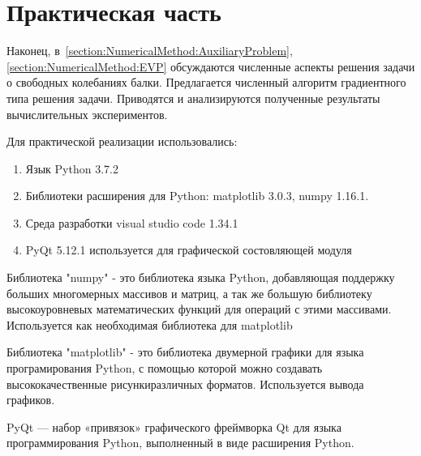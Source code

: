 \chapter{Практическая часть}
\label{chapter:OptimalBeamDesign}
\thispagestyle{fancy}
%
%
\par
%
%
%
Наконец, в \,\ref{section:NumericalMethod:AuxiliaryProblem}, \ref{section:NumericalMethod:EVP}
обсуждаются численные аспекты решения задачи о свободных колебаниях балки.
Предлагается численный алгоритм градиентного типа решения задачи.
%
%
% 
Приводятся и анализируются полученные результаты вычислительных экспериментов.
%
%
%
\bigskip
\par
Для практической реализации использовались:
\begin{enumerate}
\item Язык Python 3.7.2
\item Библиотеки расширения для Python: matplotlib 3.0.3, numpy 1.16.1.
\item Среда разработки visual studio code 1.34.1
\item PyQt 5.12.1 используется для графической состовляющей модуля
\end{enumerate}

%
%
%
\par
Библиотека "numpy" - это библиотека языка Python, добавляющая поддержку больших многомерных массивов и матриц, а так же большую библиотеку высокоуровневых математических функций для операций с этими массивами. Используется как необходимая библиотека для matplotlib
%
%
%
\bigskip
\par
Библиотека "matplotlib" - это библиотека двумерной графики для языка програмирования Python, с помощью которой можно создавать высококачественные рисункиразличных форматов. Используется вывода графиков.
%
%
%
\bigskip
\par
PyQt — набор «привязок» графического фреймворка Qt для языка программирования Python, выполненный в виде расширения Python.










